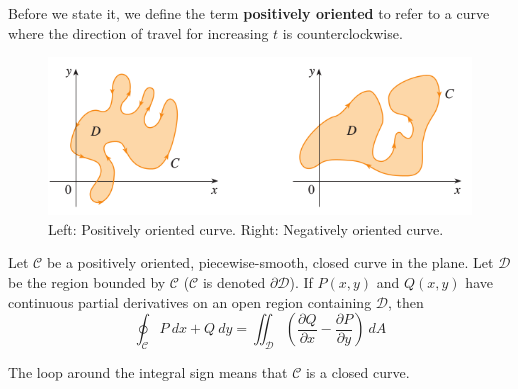 \documentclass[12pt]{article}
\begin{document}
Before we state it, we define the term \textbf{positively oriented} to refer to a curve where the direction of travel for increasing $t$ is counterclockwise. 
\begin{figure}
  \centering
  \includegraphics[scale=0.4]{curves}
  \caption{Left: Positively oriented curve. Right: Negatively oriented curve.}
\end{figure}
\begin{theorem}
Let $\mathcal{C}$ be a positively oriented, piecewise-smooth, closed curve in the plane. Let $\mathcal{D}$ be the region bounded by $\mathcal{C}$ ($\mathcal{C}$ is denoted $\partial \mathcal{D}$). If $P(x,y)$ and $Q(x,y)$ have continuous partial derivatives on an open region containing $\mathcal{D}$, then \[ \oint_{\mathcal{C}}P \ dx + Q \ dy = \iint_{\mathcal{D}}\left(\frac{\partial Q}{\partial x} - \frac{\partial P}{\partial y}\right) \ dA \]
\end{theorem}
The loop around the integral sign means that $\mathcal{C}$ is a closed curve. 
\end{document}
